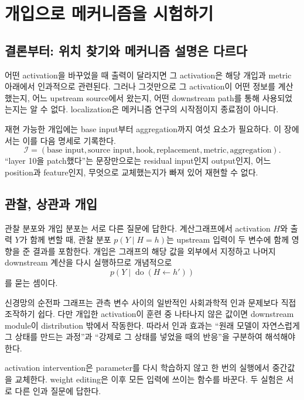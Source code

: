 \chapter{개입으로 메커니즘을 시험하기}
\label{chap:phase6}

\section{결론부터: 위치 찾기와 메커니즘 설명은 다르다}

어떤 activation을 바꾸었을 때 출력이 달라지면 그 activation은 해당 개입과 metric 아래에서 인과적으로 관련된다.
그러나 그것만으로 그 activation이 어떤 정보를 계산했는지, 어느 upstream source에서 왔는지, 어떤 downstream path를 통해 사용되었는지는 알 수 없다.
localization은 메커니즘 연구의 시작점이지 종료점이 아니다.

재현 가능한 개입에는 base input부터 aggregation까지 여섯 요소가 필요하다.
이 장에서는 이를 다음 명세로 기록한다.
\begin{equation}
  \mathcal{I}=(\text{base input},\text{source input},\text{hook},
  \text{replacement},\text{metric},\text{aggregation}).
  \label{eq:intervention-spec}
\end{equation}
``layer 10을 patch했다''는 문장만으로는 residual input인지 output인지, 어느 position과 feature인지, 무엇으로 교체했는지가 빠져 있어 재현할 수 없다.

\section{관찰, 상관과 개입}

관찰 분포와 개입 분포는 서로 다른 질문에 답한다.
계산그래프에서 activation $H$와 출력 $Y$가 함께 변할 때, 관찰 분포 $p(Y\mid H=h)$는 upstream 입력이 두 변수에 함께 영향을 준 결과를 포함한다.
개입은 그래프의 해당 값을 외부에서 지정하고 나머지 downstream 계산을 다시 실행하므로 개념적으로
\begin{equation}
  p(Y\mid \operatorname{do}(H\leftarrow h'))
\end{equation}
를 묻는 셈이다.

신경망의 순전파 그래프는 관측 변수 사이의 일반적인 사회과학적 인과 문제보다 직접 조작하기 쉽다.
다만 개입한 activation이 훈련 중 나타나지 않은 값이면 downstream module이 distribution 밖에서 작동한다.
따라서 인과 효과는 ``원래 모델이 자연스럽게 그 상태를 만드는 과정''과 ``강제로 그 상태를 넣었을 때의 반응''을 구분하여 해석해야 한다.

\begin{factbox}
activation intervention은 parameter를 다시 학습하지 않고 한 번의 실행에서 중간값을 교체한다.
weight editing은 이후 모든 입력에 쓰이는 함수를 바꾼다.
두 실험은 서로 다른 인과 질문에 답한다.
\end{factbox}

